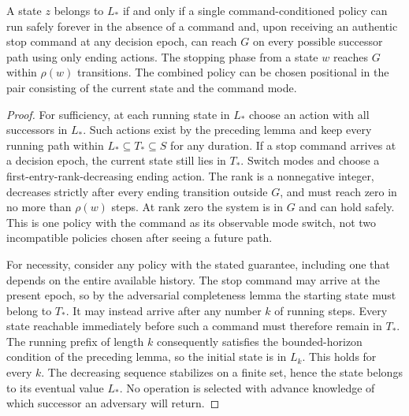 \begin{theorem}\label{r:joint-ending}
A state $z$ belongs to $L_*$ if and only if a single command-conditioned policy can run safely forever in the absence of a command and, upon receiving an authentic stop command at any decision epoch, can reach $G$ on every possible successor path using only ending actions. The stopping phase from a state $w$ reaches $G$ within $\rho(w)$ transitions. The combined policy can be chosen positional in the pair consisting of the current state and the command mode.
\end{theorem}
\begin{proof}
For sufficiency, at each running state in $L_*$ choose an action with all successors in $L_*$. Such actions exist by the preceding lemma and keep every running path within $L_*\subseteq T_*\subseteq S$ for any duration. If a stop command arrives at a decision epoch, the current state still lies in $T_*$. Switch modes and choose a first-entry-rank-decreasing ending action. The rank is a nonnegative integer, decreases strictly after every ending transition outside $G$, and must reach zero in no more than $\rho(w)$ steps. At rank zero the system is in $G$ and can hold safely. This is one policy with the command as its observable mode switch, not two incompatible policies chosen after seeing a future path.

For necessity, consider any policy with the stated guarantee, including one that depends on the entire available history. The stop command may arrive at the present epoch, so by the adversarial completeness lemma the starting state must belong to $T_*$. It may instead arrive after any number $k$ of running steps. Every state reachable immediately before such a command must therefore remain in $T_*$. The running prefix of length $k$ consequently satisfies the bounded-horizon condition of the preceding lemma, so the initial state is in $L_k$. This holds for every $k$. The decreasing sequence stabilizes on a finite set, hence the state belongs to its eventual value $L_*$. No operation is selected with advance knowledge of which successor an adversary will return.
\end{proof}


